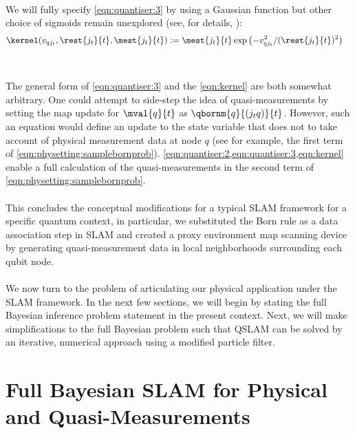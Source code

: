 \\
 We will fully specify \cref{eqn:quantiser:3} by using  a Gaussian function but other choice of sigmoids remain unexplored (see, for details, \cite{ito1992approximation}):
\begin{align}
	\kernel(v_{qj_t},\rest{j_t}{t}, \mest{j_t}{t}) &:= \mest{j_t}{t}\exp\left(-v_{qj_t}^2 / (\rest{j_t}{t})^2 \right)  \label{eqn:kernel}
\end{align} \\
\\ The general form of \cref{eqn:quantiser:3} and the \cref{eqn:kernel} are both somewhat arbitrary. One could attempt to side-step the idea of quasi-measurements by setting the map update for $\mval{q}{t}$ as $\qbornm{q}{(j_tq)}{t}$. However, such an equation would define an update to the state variable that does not to take account of physical measurement data at node $q$ (see for example, the first term of \cref{eqn:physetting:samplebornprob}).  \cref{eqn:quantiser:2,eqn:quantiser:3,eqn:kernel} enable a full calculation of the quasi-measurements in the second term of \cref{eqn:physetting:samplebornprob}. \\
\\
This concludes the conceptual modifications for a typical SLAM framework for a specific quantum context, in particular, we substituted the Born rule as a data association step in SLAM and created a proxy environment map scanning device by generating quasi-measurement data in local neighborhoods surrounding each qubit node. \\
\\
We now turn to the problem of articulating our physical application under the SLAM framework. In the next few sections, we will begin by stating the full Bayesian inference problem statement in the present context. Next, we will make simplifications to the full Bayesian problem such that QSLAM can be solved by an iterative, numerical approach using a modified particle filter. 
\iffalse
The performance of any inference framework using both physical and quasi-measurements depends on two critical factors: (a) estimating the relevant length scales for all $j_t$ neighbourhoods, in the vector $\rstate{t}$, as data is made available and (b) that the design of the kernel function $\kernel$ improves state estimation without introducing a systematic bias to the inference procedure. We use substantial numerical simulations to characterise and check quasi-measurement framework in \cref{sec:results}.
\fi

\section{Full Bayesian SLAM for Physical and Quasi-Measurements}  \label{sec:qslam}
 
